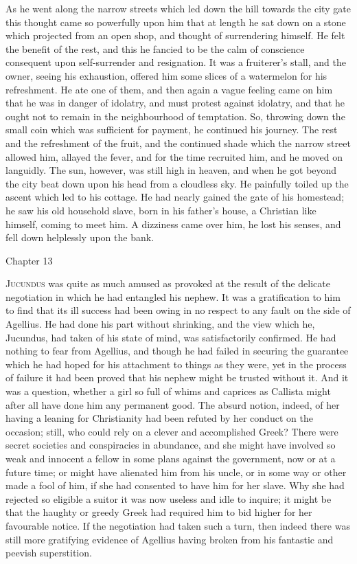 As he went along the narrow streets which led down the hill towards
the city gate this thought came so powerfully upon him that at length
he sat down on a stone which projected from an open shop, and thought
of surrendering himself. He felt the benefit of the rest, and
this he fancied to be the calm of conscience consequent upon
self-surrender and resignation. It was a fruiterer's stall, and the
owner, seeing his exhaustion, offered him some slices of a watermelon
for his refreshment. He ate one of them, and then again a vague
feeling came on him that he was in danger of idolatry, and must
protest against idolatry, and that he ought not to remain in the
neighbourhood of temptation. So, throwing down the small coin which
was sufficient for payment, he continued his journey. The rest and the
refreshment of the fruit, and the continued shade which the narrow
street allowed him, allayed the fever, and for the time recruited him,
and he moved on languidly. The sun, however, was still high in heaven,
and when he got beyond the city beat down upon his head from a
cloudless sky. He painfully toiled up the ascent which led to his
cottage. He had nearly gained the gate of his homestead; he saw his
old household slave, born in his father's house, a Christian like
himself, coming to meet him. A dizziness came over him, he lost his
senses, and fell down helplessly upon the bank.

Chapter 13


J\textsc{ucundus} was quite as much amused as provoked at the result
of the delicate negotiation in which he had entangled his nephew. It
was a gratification to him to find that its ill success had been owing
in no respect to any fault on the side of Agellius. He had done his
part without shrinking, and the view which he, Jucundus, had taken of
his state of mind, was satisfactorily confirmed. He had nothing to
fear from Agellius, and though he had failed in securing the guarantee
which he had hoped for his attachment to things as they were, yet in
the process of failure it had been proved that his nephew might be
trusted without it. And it was a question, whether a girl so full of
whims and caprices as Callista might after all have done him any
permanent good. The absurd notion, indeed, of her having a leaning for
Christianity had been refuted by her conduct on the occasion; still,
who could rely on a clever and accomplished Greek? There were secret
societies and conspiracies in abundance, and she might have involved
so weak and innocent a fellow in some plans against the government,
now or at a future time; or might have alienated him from his
uncle, or in some way or other made a fool of him, if she had
consented to have him for her slave. Why she had rejected so eligible
a suitor it was now useless and idle to inquire; it might be that the
haughty or greedy Greek had required him to bid higher for her
favourable notice. If the negotiation had taken such a turn, then
indeed there was still more gratifying evidence of Agellius having
broken from his fantastic and peevish superstition.

